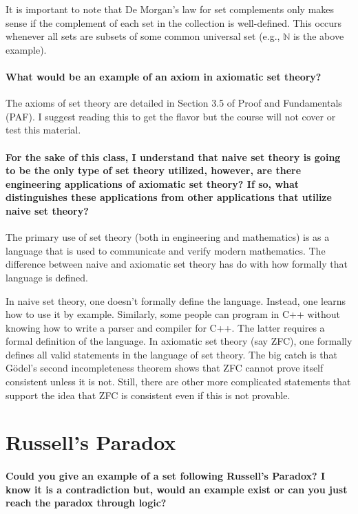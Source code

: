 \documentclass[10pt,english]{article}
\begin{document}
It is important to note that De Morgan's law for set complements only makes sense if the complement of each set in the collection is well-defined.
This occurs whenever all sets are subsets of some common universal set (e.g., $\mathbb{N}$ is the above example).


\paragraph{What would be an example of an axiom in axiomatic set theory?}

The axioms of set theory are detailed in Section 3.5 of Proof and Fundamentals (PAF).
I suggest reading this to get the flavor but the course will not cover or test this material.

\paragraph{For the sake of this class, I understand that naive set theory is going to be the only type of set theory utilized, however, are there engineering applications of axiomatic set theory? If so, what distinguishes these applications from other applications that utilize naive set theory?}

The primary use of set theory (both in engineering and mathematics) is as a language that is used to communicate and verify modern mathematics.
The difference between naive and axiomatic set theory has do with how formally that language is defined.

In naive set theory, one doesn't formally define the language.
Instead, one learns how to use it by example.
Similarly, some people can program in C++ without knowing how to write a parser and compiler for C++.
The latter requires a formal definition of the language.
In axiomatic set theory (say ZFC), one formally defines all valid statements in the language of set theory.
The big catch is that G\"{o}del's second incompleteness theorem shows that ZFC cannot prove itself consistent unless it is not.
Still, there are other more complicated statements that support the idea that ZFC is consistent even if this is not provable.

\section{Russell's Paradox}

\paragraph{Could you give an example of a set following Russell's Paradox? I know it is a contradiction but, would an example exist or can you just reach the paradox through logic?}
\end{document}
